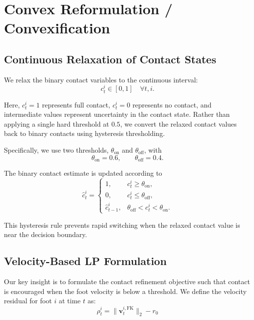 \documentclass[conference]{IEEEtran}
\begin{document}
\section{Convex Reformulation / Convexification}

\subsection{Continuous Relaxation of Contact States}

We relax the binary contact variables to the continuous interval:
\begin{equation}
c_t^i \in [0, 1] \quad \forall t, i .
\end{equation}

Here, $c_t^i = 1$ represents full contact, $c_t^i = 0$ represents no contact, and intermediate values represent uncertainty in the contact state. 
Rather than applying a single hard threshold at $0.5$, we convert the relaxed contact values back to binary contacts using hysteresis thresholding.

Specifically, we use two thresholds, $\theta_{\mathrm{on}}$ and $\theta_{\mathrm{off}}$, with
\begin{equation}
\theta_{\mathrm{on}} = 0.6, 
\qquad
\theta_{\mathrm{off}} = 0.4 .
\end{equation}

The binary contact estimate is updated according to
\begin{equation}
\hat{c}_t^i =
\begin{cases}
1, & c_t^i \geq \theta_{\mathrm{on}}, \\
0, & c_t^i \leq \theta_{\mathrm{off}}, \\
\hat{c}_{t-1}^i, & \theta_{\mathrm{off}} < c_t^i < \theta_{\mathrm{on}} .
\end{cases}
\end{equation}

This hysteresis rule prevents rapid switching when the relaxed contact value is near the decision boundary. 

\subsection{Velocity-Based LP Formulation}

Our key insight is to formulate the contact refinement objective such that contact is encouraged when the foot velocity
is below a threshold. We define the velocity residual for foot $i$ at time $t$ as:
\begin{equation}
\rho_t^i = \|\mathbf{v}_t^{i,\text{FK}}\|_2 - r_0
\end{equation}
\end{document}

